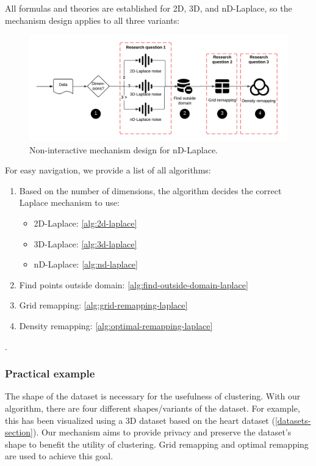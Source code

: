 All formulas and theories are established for 2D, 3D, and nD-Laplace, so the mechanism design applies to all three variants:
\begin{figure}[h]
  \includegraphics[width=1.1\textwidth]{TheorethicalFramework//ND-Laplace//Images/Thesis-nd - final-mechanism-design.png}
  \caption{Non-interactive mechanism design for nD-Laplace.}
  \label{fig:final-mechanism-design}
\end{figure}
For easy navigation, we provide a list of all algorithms:
\begin{enumerate}
  \item Based on the number of dimensions, the algorithm decides the correct Laplace mechanism to use:
        \begin{itemize}
          \item 2D-Laplace:  \ref{alg:2d-laplace}
          \item 3D-Laplace: \ref{alg:3d-laplace}
          \item nD-Laplace: \ref{alg:nd-laplace}
        \end{itemize}
  \item Find points outside domain: \ref{alg:find-outside-domain-laplace}
  \item Grid remapping: \ref{alg:grid-remapping-laplace}
  \item Density remapping: \ref{alg:optimal-remapping-laplace}
\end{enumerate}
.
\subsubsection{Practical example}
The shape of the dataset is necessary for the usefulness of clustering.
With our algorithm, there are four different shapes/variants of the dataset.
For example, this has been visualized using a 3D dataset based on the heart dataset (\ref{datasets-section}).
Our mechanism aims to provide privacy and preserve the dataset's shape to benefit the utility of clustering.
Grid remapping and optimal remapping are used to achieve this goal.

